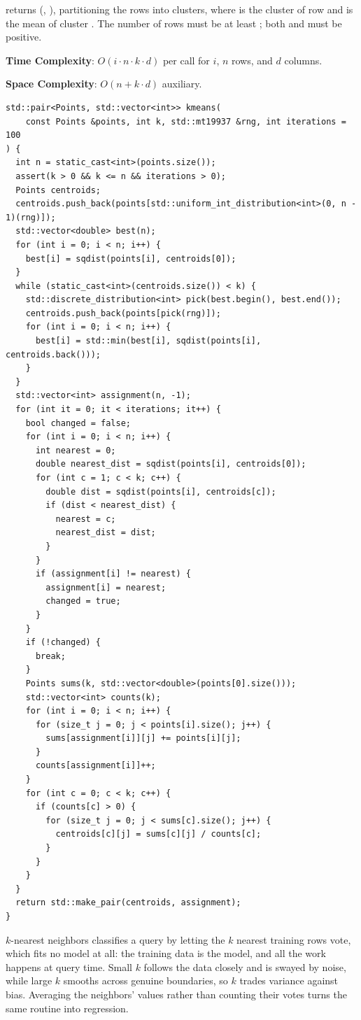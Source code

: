 \begin{compactitem}
  \item {} returns (, ), partitioning the rows into  clusters, where  is the cluster of row  and  is the mean of cluster . The number of rows must be at least ; both  and  must be positive.
\end{compactitem}

\textbf{Time Complexity}: $O(i \cdot n \cdot k \cdot d)$ per call for  $i$, $n$ rows, and $d$ columns.

\textbf{Space Complexity}: $O(n + k \cdot d)$ auxiliary.

\begin{lstlisting}[style=cpp]
std::pair<Points, std::vector<int>> kmeans(
    const Points &points, int k, std::mt19937 &rng, int iterations = 100
) {
  int n = static_cast<int>(points.size());
  assert(k > 0 && k <= n && iterations > 0);
  Points centroids;
  centroids.push_back(points[std::uniform_int_distribution<int>(0, n - 1)(rng)]);
  std::vector<double> best(n);
  for (int i = 0; i < n; i++) {
    best[i] = sqdist(points[i], centroids[0]);
  }
  while (static_cast<int>(centroids.size()) < k) {
    std::discrete_distribution<int> pick(best.begin(), best.end());
    centroids.push_back(points[pick(rng)]);
    for (int i = 0; i < n; i++) {
      best[i] = std::min(best[i], sqdist(points[i], centroids.back()));
    }
  }
  std::vector<int> assignment(n, -1);
  for (int it = 0; it < iterations; it++) {
    bool changed = false;
    for (int i = 0; i < n; i++) {
      int nearest = 0;
      double nearest_dist = sqdist(points[i], centroids[0]);
      for (int c = 1; c < k; c++) {
        double dist = sqdist(points[i], centroids[c]);
        if (dist < nearest_dist) {
          nearest = c;
          nearest_dist = dist;
        }
      }
      if (assignment[i] != nearest) {
        assignment[i] = nearest;
        changed = true;
      }
    }
    if (!changed) {
      break;
    }
    Points sums(k, std::vector<double>(points[0].size()));
    std::vector<int> counts(k);
    for (int i = 0; i < n; i++) {
      for (size_t j = 0; j < points[i].size(); j++) {
        sums[assignment[i]][j] += points[i][j];
      }
      counts[assignment[i]]++;
    }
    for (int c = 0; c < k; c++) {
      if (counts[c] > 0) {
        for (size_t j = 0; j < sums[c].size(); j++) {
          centroids[c][j] = sums[c][j] / counts[c];
        }
      }
    }
  }
  return std::make_pair(centroids, assignment);
}
\end{lstlisting}
$k$-nearest neighbors classifies a query by letting the $k$ nearest training rows vote, which fits no model at all: the training data is the model, and all the work happens at query time. Small $k$ follows the data closely and is swayed by noise, while large $k$ smooths across genuine boundaries, so $k$ trades variance against bias. Averaging the neighbors' values rather than counting their votes turns the same routine into regression.

